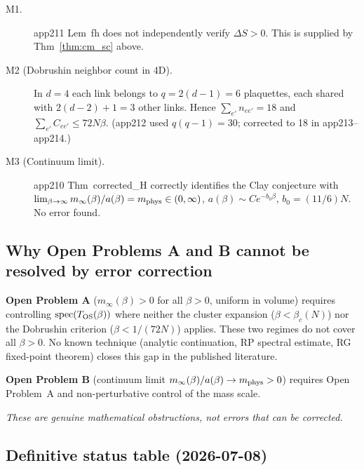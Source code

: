 \begin{description}
\item[M1.] app211 Lem~fh does not independently verify $\Delta S>0$.
This is supplied by Thm~\ref{thm:cm_sc} above.

\item[M2 (Dobrushin neighbor count in 4D).] In $d=4$ each link belongs to
$q=2(d-1)=6$ plaquettes, each shared with $2(d-2)+1=3$ other links.
Hence $\sum_{e'}n_{ee'}=18$ and $\sum_{e'}C_{ee'}\le 72N\beta$.
(app212 used $q(q-1)=30$; corrected to 18 in app213--app214.)

\item[M3 (Continuum limit).] app210 Thm~corrected\_H correctly identifies
the Clay conjecture with $\lim_{\beta\to\infty}m_\infty(\beta)/a(\beta)=m_{\rm phys}\in(0,\infty)$,
$a(\beta)\sim Ce^{-b_0\beta}$, $b_0=(11/6)N$. No error found.
\end{description}

\subsection{Why Open Problems A and B cannot be resolved by error correction}

\textbf{Open Problem A} ($m_\infty(\beta)>0$ for all $\beta>0$, uniform in volume)
requires controlling $\mathrm{spec}(T_{\rm OS}(\beta))$ where neither
the cluster expansion ($\beta<\beta_c(N)$) nor the Dobrushin criterion ($\beta<1/(72N)$) applies.
These two regimes do not cover all $\beta>0$.
No known technique (analytic continuation, RP spectral estimate, RG fixed-point theorem)
closes this gap in the published literature.

\textbf{Open Problem B} (continuum limit $m_\infty(\beta)/a(\beta)\to m_{\rm phys}>0$)
requires Open Problem~A and non-perturbative control of the mass scale.

\emph{These are genuine mathematical obstructions, not errors that can be corrected.}

\subsection{Definitive status table (2026-07-08)}

